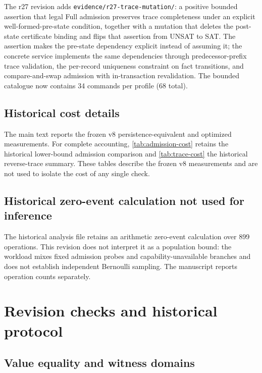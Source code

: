 \documentclass[preprint,12pt,authoryear]{elsarticle}
\newcommand{\code}[1]{\nolinkurl{#1}}
\begin{document}
The r27 revision adds \code{evidence/r27-trace-mutation/}: a positive bounded assertion that legal Full admission preserves trace completeness under an explicit well-formed-pre-state condition, together with a mutation that deletes the post-state certificate binding and flips that assertion from UNSAT to SAT. The assertion makes the pre-state dependency explicit instead of assuming it; the concrete service implements the same dependencies through predecessor-prefix trace validation, the per-record uniqueness constraint on fact transitions, and compare-and-swap admission with in-transaction revalidation. The bounded catalogue now contains 34 commands per profile (68 total).


\subsection{Historical cost details}
\label{app:historical-cost}

The main text reports the frozen v8 persistence-equivalent and optimized measurements. For complete accounting, \cref{tab:admission-cost} retains the historical lower-bound admission comparison and \cref{tab:trace-cost} the historical reverse-trace summary. These tables describe the frozen v8 measurements and are not used to isolate the cost of any single check.





\subsection{Historical zero-event calculation not used for inference}
\label{app:zero-event}
The historical analysis file retains an arithmetic zero-event calculation over 899 operations. This revision does not interpret it as a population bound: the workload mixes fixed admission probes and capability-unavailable branches and does not establish independent Bernoulli sampling. The manuscript reports operation counts separately.

\section{Revision checks and historical protocol}
\subsection{Value equality and witness domains}
\end{document}
